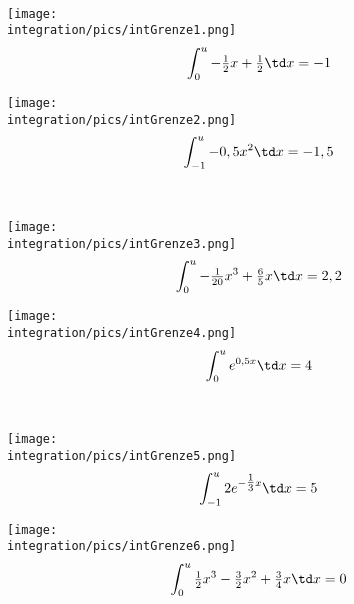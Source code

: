 \begin{Exercise}[title={\raggedright\normalfont Schätze jeweils ein \(u\) graphisch ab und berechne dann die Lösung. Das gesuchte \(u\) soll immer größer als die untere Grenze sein:}, label=intGrenzeA1]\\
	\begin{minipage}{\textwidth}
		\begin{minipage}{.5\textwidth}
			\texttt{[image: \\integration/pics/intGrenze1.png]}
			\[\int_0^u-\tfrac{1}{2}x+\tfrac{1}{2} \td x=-1\]
		\end{minipage}
		\begin{minipage}{.5\textwidth}
			\texttt{[image: \\integration/pics/intGrenze2.png]}
			\[\int_{-1}^u-0,5x^2 \td x=-1,5\]
		\end{minipage}\vspace{\baselineskip}\\
		\begin{minipage}{.5\textwidth}
			\texttt{[image: \\integration/pics/intGrenze3.png]}
			\[\int_0^u-\tfrac{1}{20}x^3+\tfrac{6}{5}x \td x=2,2\]
		\end{minipage}
		\begin{minipage}{.5\textwidth}
			\texttt{[image: \\integration/pics/intGrenze4.png]}
			\[\int_0^u e^{0,5x} \td x=4\]
		\end{minipage}\vspace{\baselineskip}\\
		\begin{minipage}{.5\textwidth}
			\texttt{[image: \\integration/pics/intGrenze5.png]}
			\[\int_{-1}^u 2e^{-\tfrac{1}{3}x} \td x=5\]
			\phantom{Finde 2 verschiedene \(u>0\).}
		\end{minipage}
		\begin{minipage}{.5\textwidth}
			\texttt{[image: \\integration/pics/intGrenze6.png]}
			\[\int_0^u \tfrac{1}{2}x^3-\tfrac{3}{2}x^2+\tfrac{3}{4}x \td x=0\]
		\end{minipage}
	\end{minipage}
\end{Exercise}

